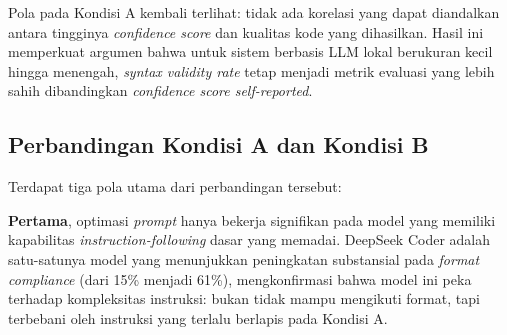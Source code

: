 Pola pada Kondisi A kembali terlihat: tidak ada korelasi yang dapat diandalkan 
antara tingginya \textit{confidence score} dan kualitas kode yang dihasilkan. 
Hasil ini memperkuat argumen bahwa untuk sistem berbasis LLM lokal 
berukuran kecil hingga menengah, \textit{syntax validity rate} 
tetap menjadi metrik evaluasi yang lebih sahih dibandingkan 
\textit{confidence score self-reported}.
\subsection{Perbandingan Kondisi A dan Kondisi B}

\begin{table}[h]
\caption{Perbandingan metrik utama Kondisi A vs Kondisi B untuk kelima model LLM}
\vspace{0.5em}
\centering
\label{tab:ab-comparison}
\end{table}

Terdapat tiga pola utama dari perbandingan tersebut:

\textbf{Pertama}, optimasi \textit{prompt} hanya bekerja signifikan pada model yang memiliki kapabilitas \textit{instruction-following} dasar yang memadai. DeepSeek Coder adalah satu-satunya model yang menunjukkan peningkatan substansial pada \textit{format compliance} (dari 15\% menjadi 61\%), mengkonfirmasi bahwa model ini peka terhadap kompleksitas instruksi: bukan tidak mampu mengikuti format, tapi terbebani oleh instruksi yang terlalu berlapis pada Kondisi A.

